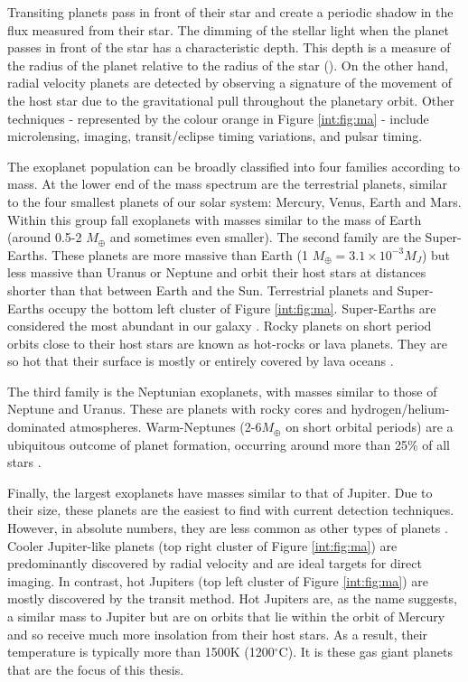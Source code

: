 Transiting planets pass in front of their star and create a periodic shadow in the flux measured from their star. The dimming of the stellar light when the planet passes in front of the star has a characteristic depth. This depth is a measure of the radius of the planet relative to the radius of the star (\rprss). On the other hand, radial velocity planets are detected by observing a signature of the movement of the host star due to the gravitational pull throughout the planetary orbit. Other techniques - represented by the colour orange in Figure \ref{int:fig:ma} - include microlensing, imaging, transit/eclipse timing variations, and pulsar timing.

The exoplanet population can be broadly classified into four families according to mass. At the lower end of the mass spectrum are the terrestrial planets, similar to the four smallest planets of our solar system: Mercury, Venus, Earth and Mars. Within this group fall  exoplanets with masses similar to the mass of Earth (around 0.5-2 $M_\oplus$ and sometimes even smaller). The second family are the Super-Earths. These planets are more massive than Earth (1 $M_\oplus = 3.1\times10^{-3} M_J$) but less massive than Uranus or Neptune and orbit their host stars at distances shorter than that between Earth and the Sun. Terrestrial planets and Super-Earths occupy the bottom left cluster of Figure \ref{int:fig:ma}. Super-Earths are considered the most abundant in our galaxy \citep{Borucki2011,Howard2012,Morton2014,Batalha2014,Petigura2013a,Petigura2018,Fulton2017,Bryson2020}. Rocky planets on short period orbits close to their host stars are known as hot-rocks or lava planets. They are so hot that their surface is mostly or entirely covered by lava oceans \citep[e.g.,][]{Leger2011, Elkins-Tanton2012, Winn2018}.

The third family is the Neptunian exoplanets, with masses similar to those of Neptune and Uranus. These are planets with rocky cores and  hydrogen/helium-dominated atmospheres. Warm-Neptunes (2-6$M_\oplus$ on short orbital periods) are a ubiquitous outcome of planet formation, occurring around more than 25\% of all stars \citep[e.g.,][]{Buchhave2014, Fulton2017}.

Finally, the largest exoplanets have masses similar to that of Jupiter. Due to their size, these planets are the easiest to find with current detection techniques. However, in absolute numbers, they are less common as other types of planets \citep[e.g.,][]{Gould2006,Howard2012,Fressin2013,Santerne2012,Wright2012}. Cooler Jupiter-like planets (top right cluster of Figure \ref{int:fig:ma}) are predominantly discovered by radial velocity and are ideal targets for direct imaging. In contrast, hot Jupiters (top left cluster of Figure \ref{int:fig:ma}) are mostly discovered by the transit method. Hot Jupiters are, as the name suggests, a similar mass to Jupiter but are on orbits that lie within the orbit of Mercury and so receive much more insolation from their host stars. As a result, their temperature is typically more than 1500K (1200$^\circ$C).  It is these gas giant planets that are the focus of this thesis.

